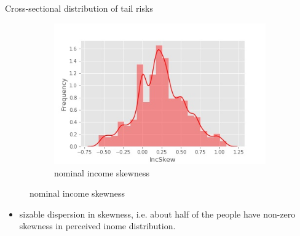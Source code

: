 \documentclass{beamer}
\begin{document}
\begin{frame}{Cross-sectional distribution of tail risks}
	\begin{figure}
	\centering
	\label{incskew_hist}
	\begin{subfigure}[b]{0.45\textwidth}
		\centering
		\caption{nominal income skewness}
		\includegraphics[width=\textwidth]{figures/histincSkew}
	\end{subfigure}
\end{figure}
	\begin{itemize}
		\item sizable dispersion in skewness, i.e. about half of the people have non-zero skewness in perceived inome distribution. 
	\end{itemize}
\end{frame}
\end{document}
